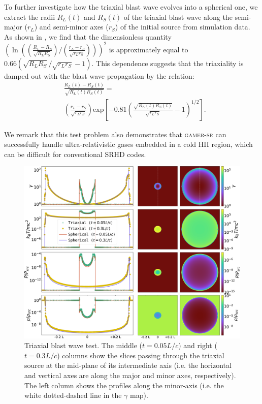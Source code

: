 To further investigate how the triaxial blast wave evolves into a spherical one, we extract the radii $R_{L}(t)$ and $R_{S}(t)$ of the triaxial blast wave along the semi-major ($r_{L}$) and semi-minor axes ($r_{S}$) of the initial source from simulation data. As shown in , we find that the dimensionless quantity $\left(\ln \left(\left(\frac{R_{L}-R_{S}}{\sqrt{R_{L}R_{S}}}\right)/ \left(\frac{r_{L}-r_{S}}{\sqrt{r_{L}r_{S}}}\right)\right)\right)^{2}$ is approximately equal to $0.66\left(\sqrt{R_{L}R_{S}}/\sqrt{r_{L}r_{S}}-1\right)$. This dependence suggests that the triaxiality is damped out with the blast wave propagation by the relation:
\begin{equation}
\begin{aligned}
          &\frac{R_{L}(t)-R_{S}(t)}{\sqrt{R_{L}(t)R_{S}(t)}} =\\ &\left(\frac{r_{L}-r_{S}}{\sqrt{r_{L}r_{S}}}\right)\text{exp}\left[-0.81\left(\frac{\sqrt{R_{L}(t)R_{S}(t)}}{\sqrt{r_{L}r_{S}}}-1\right)^{1/2}\right].
\end{aligned}
\label{eq:FittingBlast}
\end{equation}

We remark that this test problem also demonstrates that \textsc{gamer-sr} can successfully handle ultra-relativistic gases embedded in a cold HII region, which can be difficult for conventional SRHD codes.

\begin{figure}
\includegraphics[width=\linewidth]{figures/ProfileSliceLowRes.png}
\centering
\caption{Triaxial blast wave test. The middle ($t=0.05L/c$) and right ($t=0.3L/c$) columns show the slices passing through the triaxial source at the mid-plane of its intermediate axis (i.e. the horizontal and vertical axes are along the major and minor axes, respectively). The left column shows the profiles along the minor-axis (i.e. the white dotted-dashed line in the $\gamma$ map).}
\label{fig:Ellipsoid blast wave}
\end{figure}

